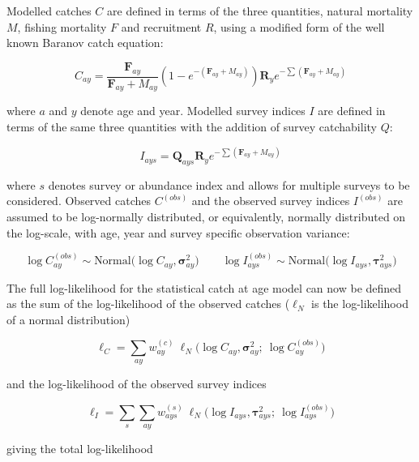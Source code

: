 \documentclass[a4paper,english,10pt]{article}\usepackage[]{graphicx}\usepackage[]{color}
\begin{document}
Modelled catches $C$ are defined in terms of the three quantities, natural mortality $M$, fishing mortality $F$ and recruitment $R$, using a modified form of the well known Baranov catch equation:

\begin{equation*}
  C_{ay} = \frac{\bm{F}_{ay}}{\bm{F}_{ay}+M_{ay}}\left(1 - e^{-(\bm{F}_{ay}+M_{ay})}\right) \bm{R}_{y}e^{-\sum (\bm{F}_{ay} + M_{ay})}
\end{equation*}

where $a$ and $y$ denote age and year. Modelled survey indices $I$ are defined in terms of the same three quantities with the addition of survey catchability $Q$:

\begin{equation*}
  I_{ays} = \bm{Q}_{ays} \bm{R}_{y}e^{-\sum (\bm{F}_{ay} + M_{ay})}
\end{equation*}

where $s$ denotes survey or abundance index and allows for multiple surveys to be considered. Observed catches $C^{(obs)}$ and the observed survey indices $I^{(obs)}$ are assumed to be log-normally distributed, or equivalently, normally distributed on the log-scale, with age, year and survey specific observation variance:

\begin{equation*}
  \log C^{(obs)}_{ay} \sim \text{Normal} \Big( \log C_{ay}, \bm{\sigma}^2_{ay}\Big) \qquad
  \log I^{(obs)}_{ays} \sim \text{Normal} \Big( \log I_{ays}, \bm{\tau}^2_{ays} \Big)
\end{equation*}

The full log-likelihood for the \aFa statistical catch at age model can now be defined as the sum of the log-likelihood of the observed catches ($\ell_N$ is the log-likelihood of a normal distribution)

\begin{equation*}
  \ell_C = \sum_{ay} w^{(c)}_{ay}\ \ell_N \Big( \log C_{ay}, \bm{\sigma}^2_{ay} ;\ \log C^{(obs)}_{ay} \Big)
\end{equation*}

and the log-likelihood of the observed survey indices

\begin{equation*}
  \ell_I = \sum_s \sum_{ay} w^{(s)}_{ays}\ \ell_N \Big( \log I_{ays}, \bm{\tau}_{ays}^2 ;\ \log I^{(obs)}_{ays} \Big)
\end{equation*}

giving the total log-likelihood
\end{document}
